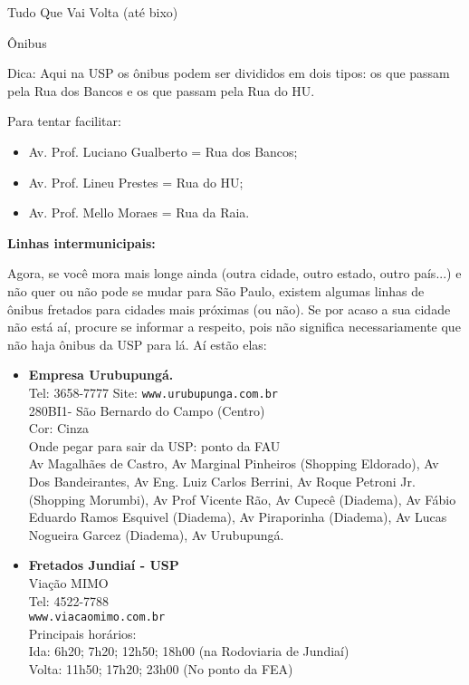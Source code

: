 \begin{secao}{Tudo Que Vai Volta (até bixo)}
\begin{subsecao}{Ônibus}
\begin{itemize}
\end{itemize}

Dica: Aqui na USP os ônibus podem ser divididos em dois tipos: os que passam
pela Rua dos Bancos e os que passam pela Rua do HU.

Para tentar facilitar:
\begin{itemize}
	\item Av. Prof. Luciano Gualberto = Rua dos Bancos;
	\item Av. Prof. Lineu Prestes = Rua do HU;
	\item Av. Prof. Mello Moraes = Rua da Raia.
\end{itemize}

{\bf Linhas intermunicipais:}

Agora, se você mora mais longe ainda (outra cidade, outro estado, outro país...) e não quer ou não pode se mudar para São Paulo, existem algumas linhas de ônibus fretados para cidades mais próximas (ou não). Se por acaso a sua cidade não está aí, procure se informar a respeito, pois não significa necessariamente que não haja ônibus da USP para lá. Aí estão elas:

\begin{itemize}
  \item {\bf Empresa Urubupungá.}\\
    Tel: 3658-7777
    Site: {\tt www.urubupunga.com.br}\\
    280BI1- São Bernardo do Campo (Centro)\\
    Cor: Cinza\\
    Onde pegar para sair da USP: ponto da FAU\\
    Av Magalhães de Castro, Av Marginal Pinheiros (Shopping Eldorado), Av Dos
    Bandeirantes, Av Eng. Luiz Carlos Berrini, Av Roque Petroni Jr. (Shopping
    Morumbi), Av Prof Vicente Rão, Av Cupecê (Diadema), Av Fábio Eduardo Ramos
    Esquivel (Diadema), Av Piraporinha (Diadema), Av Lucas Nogueira Garcez
    (Diadema), Av Urubupungá.

  \item {\bf Fretados Jundiaí - USP}\\
    Viação MIMO\\
    Tel: 4522-7788\\
    {\tt www.viacaomimo.com.br}\\
    Principais horários:\\
    Ida: 6h20; 7h20; 12h50; 18h00 (na Rodoviaria de Jundiaí)\\
    Volta: 11h50; 17h20; 23h00 (No ponto da FEA)


\end{itemize}
\end{subsecao}
\end{secao}
